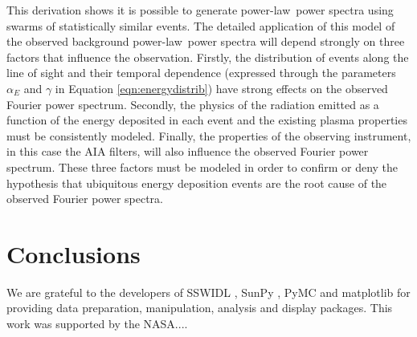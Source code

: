 \documentclass[preprint]{../aastex52/aastex}
\newcommand{\PS}{power spectrum}
\newcommand{\PL}{power-law}
\newcommand{\Fps}{Fourier \PS}
\begin{document}
This derivation shows it is possible to generate \PL\ power spectra
using swarms of statistically similar events.  The detailed
application of this model of the observed background \PL\ power
spectra will depend strongly on three factors that influence the
observation.  Firstly, the distribution of events along the line of
sight and their temporal dependence (expressed through the parameters
$\alpha_{E}$ and $\gamma$ in Equation \ref{eqn:energydistrib}) have
strong effects on the observed \Fps.  Secondly, the physics of the
radiation emitted as a function of the energy deposited in each event
and the existing plasma properties must be consistently modeled.
Finally, the properties of the observing instrument, in this case the
AIA filters, will also influence the observed \Fps.  These three
factors must be modeled in order to confirm or deny the hypothesis
that ubiquitous energy deposition events are the root cause of the
observed Fourier power spectra.


\section{Conclusions}\label{sec:conc}




\acknowledgments

We are grateful to the developers of SSWIDL \cite{}, SunPy \cite{},
PyMC \cite{} and matplotlib \cite{} for providing data preparation,
manipulation, analysis and display packages.  This work was supported
by the NASA....

\end{document}
